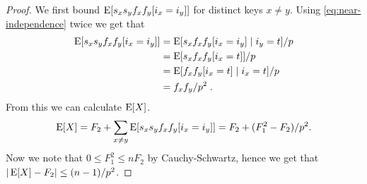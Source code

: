 \begin{proof}
    We first bound $\operatorname*{E}[s_x s_y f_x f_y [i_x = i_y]]$ for distinct keys
    $x \neq y$. Using \cref{eq:near-independence} twice we get that
    \begin{equation}\begin{split}\label{eq:twice-split}
        \operatorname*{E}[s_x s_y f_x f_y [i_x = i_y]]
            &= \operatorname*{E}[s_x f_x f_y [i_x = i_y] \mid i_y = t]/p
            \\&= \operatorname*{E}[s_x f_x f_y [i_x = t]]/p
            \\&= \operatorname*{E}[f_x f_y [i_x = t] \mid i_x = t]/p
            \\&= f_x f_y / p^2 \; .
    \end{split}\end{equation}
    From this we can calculate $\operatorname*{E}[X]$.
    \begin{align*}
        \operatorname*{E}[X]
            = F_2 + \sum_{x \neq y} \operatorname*{E}[s_x s_y f_x f_y [i_x = i_y]]
            = F_2 + (F_1^2 - F_2)/p^2 .
    \end{align*}
    Now we note that $0 \le F_1^2 \le n F_2$ by Cauchy-Schwartz, hence we get that
    $| \operatorname*{E}[X] - F_2 | \le (n - 1)/p^2$.


\end{proof}
